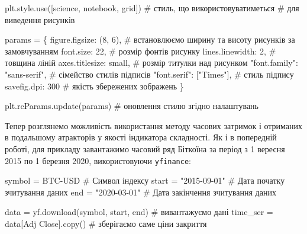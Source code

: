 \documentclass[
  letterpaper,
]{report}
\newenvironment{Shaded}{\begin{snugshade}}{\end{snugshade}}
\newcommand{\CommentTok}[1]{\textcolor[rgb]{0.37,0.37,0.37}{#1}}
\newcommand{\DecValTok}[1]{\textcolor[rgb]{0.68,0.00,0.00}{#1}}
\newcommand{\NormalTok}[1]{\textcolor[rgb]{0.00,0.23,0.31}{#1}}
\newcommand{\OperatorTok}[1]{\textcolor[rgb]{0.37,0.37,0.37}{#1}}
\newcommand{\StringTok}[1]{\textcolor[rgb]{0.13,0.47,0.30}{#1}}
\begin{document}
\begin{Shaded}
\begin{Highlighting}[]
\NormalTok{plt.style.use([}\StringTok{\textquotesingle{}science\textquotesingle{}}\NormalTok{, }\StringTok{\textquotesingle{}notebook\textquotesingle{}}\NormalTok{, }\StringTok{\textquotesingle{}grid\textquotesingle{}}\NormalTok{]) }\CommentTok{\# стиль, що використовуватиметься}
                                               \CommentTok{\# для виведення рисунків}

\NormalTok{params }\OperatorTok{=}\NormalTok{ \{}
    \StringTok{\textquotesingle{}figure.figsize\textquotesingle{}}\NormalTok{: (}\DecValTok{8}\NormalTok{, }\DecValTok{6}\NormalTok{),         }\CommentTok{\# встановлюємо ширину та висоту рисунків за замовчуванням}
    \StringTok{\textquotesingle{}font.size\textquotesingle{}}\NormalTok{: }\DecValTok{22}\NormalTok{,                  }\CommentTok{\# розмір фонтів рисунку}
    \StringTok{\textquotesingle{}lines.linewidth\textquotesingle{}}\NormalTok{: }\DecValTok{2}\NormalTok{,             }\CommentTok{\# товщина ліній}
    \StringTok{\textquotesingle{}axes.titlesize\textquotesingle{}}\NormalTok{: }\StringTok{\textquotesingle{}small\textquotesingle{}}\NormalTok{,        }\CommentTok{\# розмір титулки над рисунком}
    \StringTok{"font.family"}\NormalTok{: }\StringTok{"sans{-}serif"}\NormalTok{,      }\CommentTok{\# сімейство стилів підписів }
    \StringTok{"font.serif"}\NormalTok{: [}\StringTok{"Times"}\NormalTok{],          }\CommentTok{\# стиль підпису}
    \StringTok{\textquotesingle{}savefig.dpi\textquotesingle{}}\NormalTok{: }\DecValTok{300}                \CommentTok{\# якість збережених зображень}
\NormalTok{\}}

\NormalTok{plt.rcParams.update(params)           }\CommentTok{\# оновлення стилю згідно налаштувань}
\end{Highlighting}
\end{Shaded}

Тепер розглянемо можливість використання методу часових затримок і
отриманих в подальшому атракторів у якості індикатора складності. Як і в
попередній роботі, для прикладу завантажимо часовий ряд Біткоїна за
період з 1 вересня 2015 по 1 березня 2020, використовуючи
\texttt{yfinance}:

\begin{Shaded}
\begin{Highlighting}[]
\NormalTok{symbol }\OperatorTok{=} \StringTok{\textquotesingle{}BTC{-}USD\textquotesingle{}}       \CommentTok{\# Символ індексу}
\NormalTok{start }\OperatorTok{=} \StringTok{"2015{-}09{-}01"}     \CommentTok{\# Дата початку зчитування даних}
\NormalTok{end }\OperatorTok{=} \StringTok{"2020{-}03{-}01"}       \CommentTok{\# Дата закінчення зчитування даних}

\NormalTok{data }\OperatorTok{=}\NormalTok{ yf.download(symbol, start, end)  }\CommentTok{\# вивантажуємо дані}
\NormalTok{time\_ser }\OperatorTok{=}\NormalTok{ data[}\StringTok{\textquotesingle{}Adj Close\textquotesingle{}}\NormalTok{].copy()     }\CommentTok{\# зберігаємо саме ціни закриття}
\end{Highlighting}
\end{Shaded}
\end{document}
